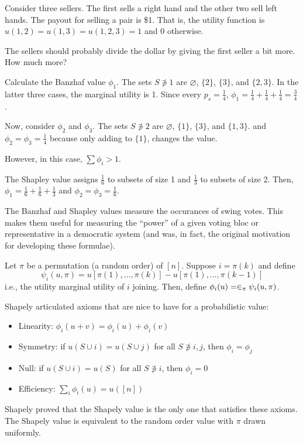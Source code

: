\documentclass[class=cs480,notes,tikz]{agony}
\begin{document}
\begin{example}
  Consider three sellers. The first sells a right hand and the other two sell left hands.
  The payout for selling a pair is \$1.
  That is, the utility function is $u(1,2) = u(1,3) = u(1,2,3) = 1$ and 0 otherwise.

  The sellers should probably divide the dollar by giving the first seller a bit more.
  How much more?
\end{example}
\begin{sol}
  Calculate the Banzhaf value $\phi_1$.
  The sets $S \not\ni 1$ are $\varnothing$, $\{2\}$, $\{3\}$, and $\{2,3\}$.
  In the latter three cases, the marginal utility is 1.
  Since every $p_s = \frac14$, $\phi_1 = \frac14 + \frac14 + \frac14 = \frac34$.

  Now, consider $\phi_2$ and $\phi_3$.
  The sets $S \not\ni 2$ are $\varnothing$, $\{1\}$, $\{3\}$, and $\{1,3\}$.
  and $\phi_2 = \phi_3 = \frac14$ because only adding to $\{1\}$, changes the value.

  However, in this case, $\sum \phi_i > 1$.

  The Shapley value assigns $\frac16$ to subsets of size 1 and $\frac13$ to subsets of size 2.
  Then, $\phi_1 = \frac16 + \frac16 + \frac13$ and $\phi_2 = \phi_3 = \frac16$.
\end{sol}

The Banzhaf and Shapley values measure the occurances of swing votes.
This makes them useful for measuring the ``power'' of a given voting bloc
or representative in a democratic system
(and was, in fact, the original motivation for developing these formulae).

\begin{defn}
  Let $\pi$ be a permutation (a random order) of $[n]$.
  Suppose $i = \pi(k)$ and define
  \[ \psi_i(u,\pi) = u[\pi(1),\dotsc,\pi(k)] - u[\pi(1),\dotsc,\pi(k-1)] \]
  i.e., the utility marginal utility of $i$ joining.
  Then, define $\phi_i(u) = \in_{\pi}\psi_i(u,\pi)$.
\end{defn}

Shapely articulated axioms that are nice to have for a probabilistic value:
\begin{itemize}
  \item Linearity: $\phi_i(u+v) = \phi_i(u) + \phi_i(v)$
  \item Symmetry: if $u(S \cup i) = u(S \cup j)$ for all $S \not\ni i,j$, then $\phi_i = \phi_j$
  \item Null: if $u(S \cup i) = u(S)$ for all $S \not\ni i$, then $\phi_i = 0$
  \item Efficiency: $\sum_i \phi_i(u) = u([n])$
\end{itemize}
Shapely proved that the Shapely value is the only one that satisfies these axioms.
The Shapely value is equivalent to the random order value with $\pi$ drawn uniformly.
\end{document}
